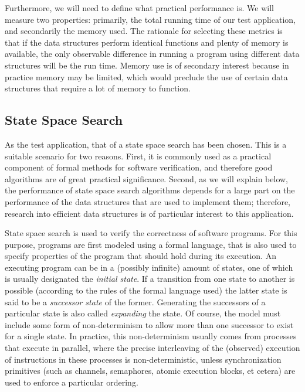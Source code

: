 \documentclass{acm_proc_article-sp}
\begin{document}
Furthermore, we will need to define what practical performance is. We will measure two properties: primarily, the total running time of our test application, and secondarily the memory used. The rationale for selecting these metrics is that if the data structures perform identical functions and plenty of memory is available, the only observable difference in running a program using different data structures will be the run time. Memory use is of secondary interest because in practice memory may be limited, which would preclude the use of certain data structures that require a lot of memory to function.

\subsection{State Space Search}
As the test application, that of a state space search has been chosen. This is a
suitable scenario for two reasons. First, it is commonly used as a practical
component of formal methods for software verification, and therefore good
algorithms are of great practical significance. Second, as we will explain
below, the performance of state space search algorithms depends for a large
part on the performance of the data structures that are used to implement
them; therefore, research into efficient data structures is of particular
interest to this application.

State space search is used to verify the correctness of software programs. For
this purpose, programs are first modeled using a formal language, that is also
used to specify properties of the program that should hold during its
execution. An executing program can be in a (possibly infinite) amount of states,
one of which is usually designated the \emph{initial state}. If a transition
from one state to another is possible (according to the rules of the formal
language used) the latter state is said to be a \emph{successor state} of the
former.
Generating the successors of a particular state is also called
\emph{expanding} the state. Of course, the model must include some form of
non-determinism to allow more than one successor to exist for a single state.
In practice, this non-determinism usually comes from processes that execute in
parallel, where the precise interleaving of the (observed) execution of
instructions in these processes is non-deterministic, unless synchronization
primitives (such as channels, semaphores, atomic execution blocks, et cetera)
are used to enforce a particular ordering.
\end{document}
